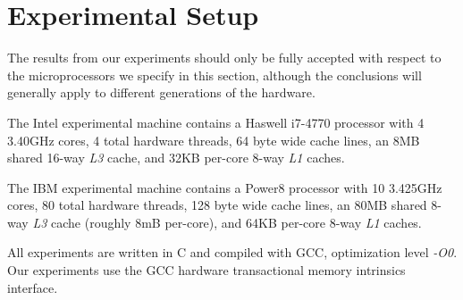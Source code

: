\section{Experimental Setup}
The results from our experiments should only be fully accepted with respect to
the microprocessors we specify in this section, although the conclusions will
generally apply to different generations of the hardware. 

The Intel experimental machine contains a Haswell i7-4770 processor with 4
3.40GHz cores, 4 total hardware threads, 64 byte wide cache lines, an 8MB
shared 16-way \textit{L3} cache, and 32KB per-core 8-way \textit{L1} caches.

The IBM experimental machine contains a Power8 processor with 10 3.425GHz cores,
80 total hardware threads, 128 byte wide cache lines, an 80MB shared 8-way
\textit{L3} cache (roughly 8mB per-core), and 64KB per-core 8-way \textit{L1}
caches.

All experiments are written in C and compiled with GCC, optimization level
\textit{-O0}. Our experiments use the GCC hardware transactional memory
intrinsics interface.
 
